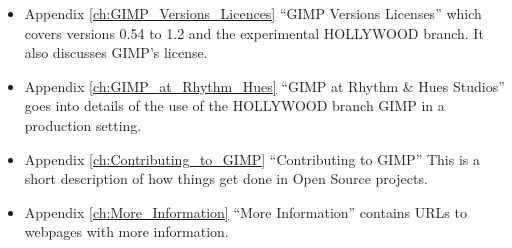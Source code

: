 \begin{itemize}

\item Appendix  \ref{ch:GIMP_Versions_Licences} ``GIMP Versions Licenses'' which
covers versions 0.54 to 1.2 and the experimental HOLLYWOOD branch. It also
discusses GIMP's license.
  
\item Appendix  \ref{ch:GIMP_at_Rhythm_Hues}  ``GIMP at Rhythm \& Hues
Studios'' goes into details of the use of the HOLLYWOOD branch GIMP in a
production setting. 

\item Appendix \ref{ch:Contributing_to_GIMP} ``Contributing to GIMP'' This is a
short description of how things get done in Open Source projects.

\item Appendix \ref{ch:More_Information} ``More Information'' contains URLs to
webpages with more information.

\end{itemize}
